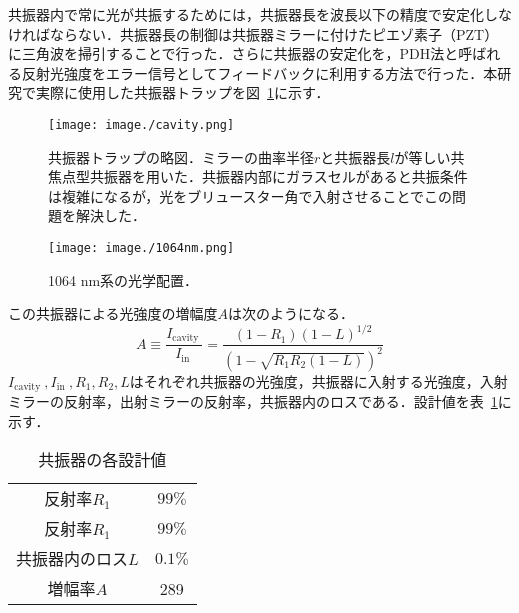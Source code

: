 \documentclass[11pt,a4j,notitlepage]{jreport}
\newcommand{\fig}[1]{図~\ref{#1}}	%
\newcommand{\tab}[1]{表~\ref{#1}}	%
\begin{document}
共振器内で常に光が共振するためには，共振器長を波長以下の精度で安定化しなければならない．共振器長の制御は共振器ミラーに付けたピエゾ素子（PZT）に三角波を掃引することで行った．さらに共振器の安定化を，PDH法と呼ばれる反射光強度をエラー信号としてフィードバックに利用する方法で行った\cite{PDH}．本研究で実際に使用した共振器トラップを\fig{fig3.3.7}に示す．
\begin{figure}[H]
	\centering
		\texttt{[image: image./cavity.png]}
	\caption{共振器トラップの略図．ミラーの曲率半径$r$と共振器長$l$が等しい共焦点型共振器を用いた．共振器内部にガラスセルがあると共振条件は複雑になるが，光をブリュースター角で入射させることでこの問題を解決した．}
	\label{fig3.3.7}
\end{figure}

\begin{figure}[h]
	\centering
		\texttt{[image: image./1064nm.png]}
	\caption{1064 nm系の光学配置．}
	\label{fig3.3.8}
\end{figure}

この共振器による光強度の増幅度$A$は次のようになる．
\begin{equation}
	A \equiv \frac{I_{\text {cavity }}}{I_{\text {in }}}=\frac{\left(1-R_{1}\right)(1-L)^{1 / 2}}{(1-\sqrt{R_{1} R_{2}(1-L)})^{2}}
	\label{eq3.3.0.5}
\end{equation}
$I_{\text {cavity }}, I_{\text {in }}, R_{1}, R_{2}, L$はそれぞれ共振器の光強度，共振器に入射する光強度，入射ミラーの反射率，出射ミラーの反射率，共振器内のロスである．設計値を\tab{tab3.3.2}に示す．
\begin{table}[h]
\centering
	\caption{共振器の各設計値}
		\begin{tabular}{cc}
		\hline
		反射率$R_{1}$ & $99\%$ \\
		反射率$R_{1}$ & $99\%$ \\
		共振器内のロス$L$ & $0.1\%$ \\
		増幅率$A$ & 289 \\ \hline
		\end{tabular}
	\label{tab3.3.2}
\end{table}
\end{document}
